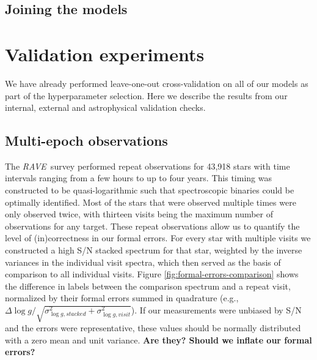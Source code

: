 \documentclass[preprint,trackchanges]{aastex}
\newcommand{\acronym}[1]{{\small{#1}}}
\newcommand{\project}[1]{\textsl{#1}}
\newcommand{\rave}{\project{\acronym{RAVE}}}
\newcommand{\stub}[1]{\textbf{#1}}
\newcommand{\logg}{\log g}
\begin{document}
\subsection{Joining the models}\label{sec:joining-the-models}




\section{Validation experiments}\label{sec:validation}

We have already performed leave-one-out cross-validation on all of our models
as part of the hyperparameter selection.  Here we describe the results from our
internal, external and astrophysical validation checks.

\subsection{Multi-epoch observations}\label{sec:repeat-observations}

The \rave\ survey performed repeat observations for 43,918 stars with time 
intervals ranging from a few hours to up to four years.  This timing was 
constructed to be quasi-logarithmic such that spectroscopic binaries could
be optimally identified. Most of the stars that were observed multiple times
were only observed twice, with thirteen visits being the maximum number 
of observations for any target.  These repeat observations allow us to 
quantify the level of (in)correctness in our formal errors.  For every star
with multiple visits we constructed a high S/N stacked spectrum for that
star, weighted by the inverse variances in the individual visit spectra,
which then served as the basis of comparison to all individual visits.  
Figure \ref{fig:formal-errors-comparison} shows the difference in labels 
between the comparison spectrum and a repeat visit, normalized by their 
formal errors summed in quadrature (e.g., 
$\Delta\logg/\sqrt{\sigma_{\logg,stacked}^2 + \sigma_{\logg,visit}^2}$).
If our measurements were unbiased by S/N and the errors were representative, 
these values should be normally distributed with a zero mean and unit variance.
\stub{Are they? Should we inflate our formal errors?}


\end{document}
